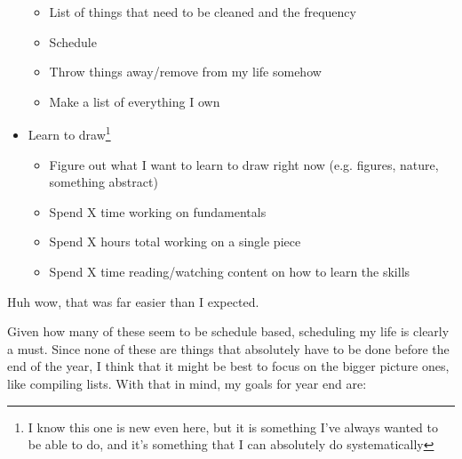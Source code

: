 \documentclass[12pt]{article}[titlepage]
\renewcommand{\,}{\textsuperscript{,}}
\begin{document}
\begin{itemize}
\begin{itemize}
\item List of things that need to be cleaned and the frequency  
\item Schedule  
\item Throw things away/remove from my life somehow  
\item Make a list of everything I own  
\end{itemize}  
\item Learn to draw\footnote{I know this one is new even here, but it is something I've always wanted to be able to do, and it's something that I can absolutely do systematically}  
\begin{itemize}  
\item Figure out what I want to learn to draw right now (e.g. figures, nature, something abstract)  
\item Spend X time working on fundamentals  
\item Spend X hours total working on a single piece  
\item Spend X time reading/watching content on how to learn the skills  
\end{itemize}  
\end{itemize}

Huh wow, that was far easier than I expected.  


Given how many of these seem to be schedule based, scheduling my life is clearly a must.  
Since none of these are things that absolutely have to be done before the end of the year, I think that it might be best to focus on the bigger picture ones, like compiling lists.  
With that in mind, my goals for year end are:
\end{document}

